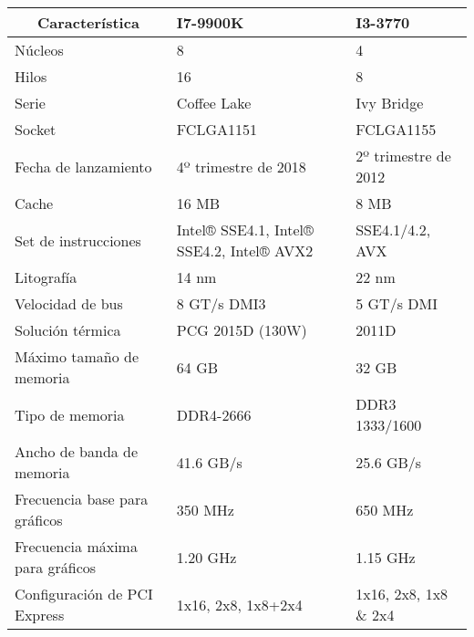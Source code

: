 \begin{tabular}{|p{5.6cm}|p{4cm}|p{4cm}|}
  \hline
  \multicolumn{1}{|c|}{\textbf{Característica}} & \textbf{I7-9900K} & \textbf{I3-3770} \\ \hline
  Núcleos & 8 & 4 \\ \hline
  Hilos & 16 & 8 \\ \hline
  Serie & Coffee Lake & Ivy Bridge \\ \hline
  Socket & FCLGA1151 & FCLGA1155 \\ \hline
  Fecha de lanzamiento & 4º trimestre de 2018 & 2º trimestre de 2012 \\ \hline
  Cache & 16 MB & 8 MB \\ \hline
  Set de instrucciones & Intel® SSE4.1, Intel® SSE4.2, Intel® AVX2 & SSE4.1/4.2, AVX \\ \hline
  Litografía & 14 nm & 22 nm \\ \hline
  Velocidad de bus & 8 GT/s DMI3 & 5 GT/s DMI \\ \hline
  Solución térmica & PCG 2015D (130W) & 2011D \\ \hline
  Máximo tamaño de memoria & 64 GB & 32 GB \\ \hline
  Tipo de memoria & DDR4-2666 & DDR3 1333/1600 \\ \hline
  Ancho de banda de memoria & 41.6 GB/s & 25.6 GB/s \\ \hline
  Frecuencia base para gráficos & 350 MHz & 650 MHz \\ \hline
  Frecuencia máxima para gráficos & 1.20 GHz & 1.15 GHz \\ \hline
  Configuración de PCI Express & 1x16, 2x8, 1x8+2x4 & 1x16, 2x8, 1x8 \& 2x4 \\ \hline
\end{tabular}